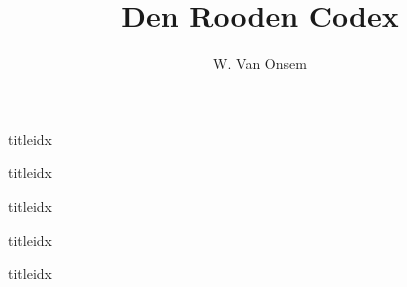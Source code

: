 \documentclass[b5paper,8pt,landscape]{article}
\title{Den Rooden Codex}
\author{W. Van Onsem}
\begin{document}
\maketitle
{}
\begin{songs}{titleidx}






\end{songs}
\begin{songs}{titleidx}

\end{songs}
\begin{songs}{titleidx}









\end{songs}
\begin{songs}{titleidx}

\end{songs}
\begin{songs}{titleidx}




\end{songs}
\end{document}
